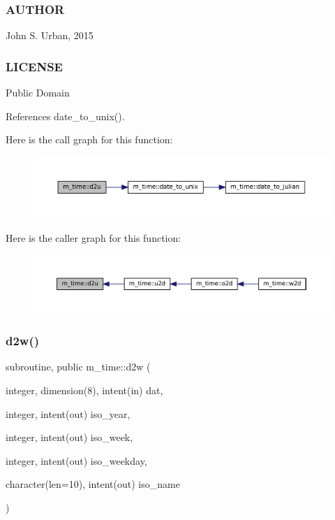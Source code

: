  \subsubsection*{A\+U\+T\+H\+OR}

John S. Urban, 2015 \subsubsection*{L\+I\+C\+E\+N\+SE}

Public Domain 

References date\+\_\+to\+\_\+unix().

Here is the call graph for this function\+:\nopagebreak
\begin{figure}[H]
\begin{center}
\leavevmode
\includegraphics[width=350pt]{namespacem__time_a1506e2889a156387df4481ed0534be81_cgraph}
\end{center}
\end{figure}
Here is the caller graph for this function\+:\nopagebreak
\begin{figure}[H]
\begin{center}
\leavevmode
\includegraphics[width=350pt]{namespacem__time_a1506e2889a156387df4481ed0534be81_icgraph}
\end{center}
\end{figure}
\mbox{\label{namespacem__time_ad4ff99ad6f6d5282c4b65ad636a2a627}} 
\subsubsection{\texorpdfstring{d2w()}{d2w()}}
{\footnotesize\ttfamily subroutine, public m\+\_\+time\+::d2w (\begin{DoxyParamCaption}\item[{integer, dimension(8), intent(in)}]{dat,  }\item[{integer, intent(out)}]{iso\+\_\+year,  }\item[{integer, intent(out)}]{iso\+\_\+week,  }\item[{integer, intent(out)}]{iso\+\_\+weekday,  }\item[{character(len=10), intent(out)}]{iso\+\_\+name }\end{DoxyParamCaption})}



